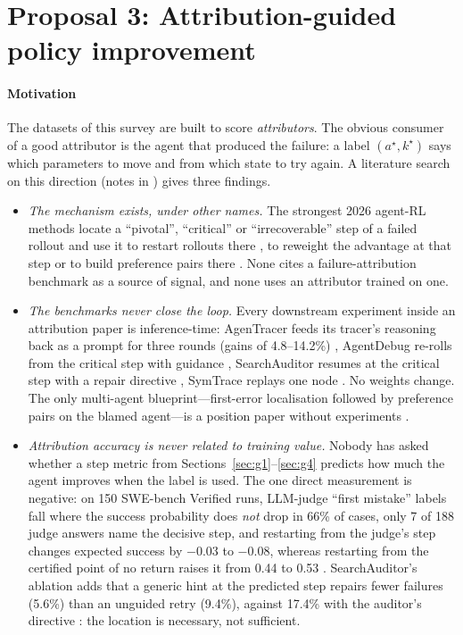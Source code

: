 \documentclass[10pt,a4paper]{article}
\begin{document}

\section{Proposal 3: Attribution-guided policy improvement}\label{sec:future:train}

\paragraph{Motivation} The datasets of this survey are built to score \emph{attributors}. The obvious consumer of a good attributor is the agent that produced the failure: a label $(a^\star,k^\star)$ says which parameters to move and from which state to try again. A literature search on this direction (notes in ) gives three findings.
\begin{itemize}[leftmargin=1.1em]
\item \emph{The mechanism exists, under other names.} The strongest 2026 agent-RL methods locate a ``pivotal'', ``critical'' or ``irrecoverable'' step of a failed rollout and use it to restart rollouts there \cite{tian2026mirl,guo2026pivoarl,shi2026r3l,liu2026sprout,liang2026elpo}, to reweight the advantage at that step \cite{zhu2026fault,huang2026etro,jung2026prover,agentevolver2025,zhu2026lvrl} or to build preference pairs there \cite{li2026cso,yuan2025agentr,steca2025,cuarecovery2026}. None cites a failure-attribution benchmark as a source of signal, and none uses an attributor trained on one.
\item \emph{The benchmarks never close the loop.} Every downstream experiment inside an attribution paper is inference-time: AgenTracer feeds its tracer's reasoning back as a prompt for three rounds (gains of 4.8--14.2\%) \cite{agentracer2026}, AgentDebug re-rolls from the critical step with guidance \cite{agentdebug2026}, SearchAuditor resumes at the critical step with a repair directive \cite{searchauditor2026}, SymTrace replays one node \cite{luan2026symtrace}. No weights change. The only multi-agent blueprint---first-error localisation followed by preference pairs on the blamed agent---is a position paper without experiments \cite{yang2025blame}.
\item \emph{Attribution accuracy is never related to training value.} Nobody has asked whether a step metric from Sections~\ref{sec:g1}--\ref{sec:g4} predicts how much the agent improves when the label is used. The one direct measurement is negative: on 150 SWE-bench Verified runs, LLM-judge ``first mistake'' labels fall where the success probability does \emph{not} drop in 66\% of cases, only 7 of 188 judge answers name the decisive step, and restarting from the judge's step changes expected success by $-0.03$ to $-0.08$, whereas restarting from the certified point of no return raises it from 0.44 to 0.53 \cite{shen2026epv}. SearchAuditor's ablation adds that a generic hint at the predicted step repairs fewer failures (5.6\%) than an unguided retry (9.4\%), against 17.4\% with the auditor's directive \cite{searchauditor2026}: the location is necessary, not sufficient.
\end{itemize}
\end{document}
